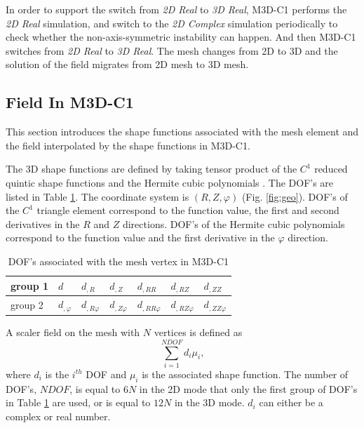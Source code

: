 \documentclass[11pt]{article}  %
\begin{document}
In order to support the switch from \textit{2D Real} to \textit{3D Real},
M3D-C1 performs the \textit{2D Real}  simulation, and switch to the \textit{2D Complex} simulation periodically to check whether the non-axis-symmetric instability can happen. And then M3D-C1 switches from \textit{2D Real} to \textit{3D Real}.  The mesh changes from 2D to 3D and the solution of the field migrates from 2D mesh to 3D mesh. 

\subsection{Field In M3D-C1} \label{sec:field}
This section introduces the shape functions associated with the mesh element and the field interpolated by the shape functions in M3D-C1.

The 3D shape functions are defined by taking tensor product of the $C^1$ reduced quintic shape functions and the Hermite cubic polynomials \cite{jardin2004triangular,jardin2012review}.  The DOF's are listed in Table \ref{tab:dofs}.  The coordinate system is $(R,Z,\varphi)$ (Fig. \ref{fig:geo}).  DOF's of the $C^1$ triangle element  correspond to the function value, the first and second derivatives in the $R$ and $Z$ directions.  DOF's of the Hermite cubic polynomials correspond to the function value and the first derivative in the $\varphi$ direction.
\begin{table}
\begin{center}
 \begin{tabular}{|l|l|l|l|l|l|l|}
\hline
group 1 &$d$ & $d_{,R}$ & $d_{,Z}$ & $d_{,RR}$ & $d_{,RZ}$ &$d_{,ZZ}$  \\ \hline
group 2 &$d_{,\varphi}$ & $d_{,R\varphi}$ & $d_{,Z\varphi}$ & $d_{,RR\varphi}$ & $d_{,RZ\varphi}$ &$d_{,ZZ\varphi}$  \\ \hline
\end{tabular}
\caption{DOF's associated with the mesh vertex in M3D-C1} \label{tab:dofs}
\end{center}
\end{table}
A scaler field on the mesh with $N$ vertices is defined as
\begin{equation}
\sum_{i=1}^{NDOF} d_i \mu_i,
\end{equation}
where $d_i$ is the  $i^{th}$ DOF and  $\mu_i$ is the associated shape function. The number of DOF's, $NDOF$, is equal to $6N$ in the 2D mode that only the first group of DOF's in Table \ref{tab:dofs} are used, or is equal to $12N$ in the 3D mode. $d_i$ can either be a complex or real number.
\end{document}
